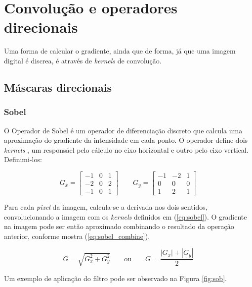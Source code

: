 \documentclass[10pt,a4paper]{article}
\newcommand{\pixel}{\textit{pixel} }
\newcommand{\kernels}{\textit{kernels} }
\begin{document}
\section{Convolução e operadores direcionais}
Uma forma de calcular o gradiente, ainda que de forma, já que uma imagem digital é discrea, é através de \kernels de convolução.
\subsection{Máscaras direcionais}
\subsubsection{Sobel}
O Operador de Sobel é um operador de diferenciação discreto que calcula uma aproximação do gradiente da intensidade em cada ponto. O operador define dois \kernels, um responsáel pelo cálculo no eixo horizontal e outro pelo eixo vertical. Definimi-los:

\begin{equation}
  G_x =\left[\begin{array}{ccc}
    -1 & 0 & 1\\
    -2 & 0 & 2\\
    -1 & 0 & 1
  \end{array}\right] \qquad
  G_y =\left[\begin{array}{ccc}
    -1 & -2 & 1\\
     0 & 0 & 0\\
    1 & 2 & 1
  \end{array}\right]
  \label{eq:sobel}
\end{equation}

Para cada \pixel da imagem, calcula-se a derivada nos dois sentidos, convolucionando a imagem com os \kernels definidos em (\ref{eq:sobel}). O gradiente na imagem pode ser então aproximado combinando o resultado da operação anterior, conforme mostra (\ref{eq:sobel_combine}).

\begin{equation}
  G = \sqrt{G_x^2 + G_y^2} \qquad \text{ou} \qquad G = \frac{\left|G_x\right|+\left|G_y\right|}{2}
  \label{eq:sobel_combine}
\end{equation}

Um exemplo de aplicação do filtro pode ser observado na Figura \ref{fig:sob}.
\end{document}
